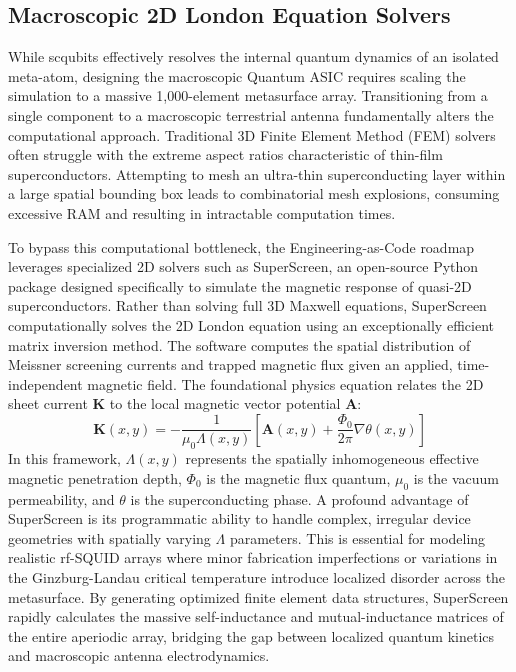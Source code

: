 \documentclass[11pt,a4paper]{article}
\begin{document}
\subsection{Macroscopic 2D London Equation Solvers}

While scqubits effectively resolves the internal quantum dynamics of an isolated meta-atom, designing the macroscopic Quantum ASIC requires scaling the simulation to a massive 1,000-element metasurface array.\cite{ref6} Transitioning from a single component to a macroscopic terrestrial antenna fundamentally alters the computational approach.\cite{ref6} Traditional 3D Finite Element Method (FEM) solvers often struggle with the extreme aspect ratios characteristic of thin-film superconductors.\cite{ref6} Attempting to mesh an ultra-thin superconducting layer within a large spatial bounding box leads to combinatorial mesh explosions, consuming excessive RAM and resulting in intractable computation times.\cite{ref6}

To bypass this computational bottleneck, the Engineering-as-Code roadmap leverages specialized 2D solvers such as SuperScreen, an open-source Python package designed specifically to simulate the magnetic response of quasi-2D superconductors.\cite{ref6} Rather than solving full 3D Maxwell equations, SuperScreen computationally solves the 2D London equation using an exceptionally efficient matrix inversion method.\cite{ref6} The software computes the spatial distribution of Meissner screening currents and trapped magnetic flux given an applied, time-independent magnetic field.\cite{ref6} The foundational physics equation relates the 2D sheet current $\mathbf{K}$ to the local magnetic vector potential $\mathbf{A}$:
\begin{equation}
\mathbf{K}(x,y) = -\frac{1}{\mu_0 \Lambda(x,y)} \left[ \mathbf{A}(x,y) + \frac{\Phi_0}{2\pi} \nabla\theta(x,y) \right]
\end{equation}
In this framework, $\Lambda(x,y)$ represents the spatially inhomogeneous effective magnetic penetration depth, $\Phi_0$ is the magnetic flux quantum, $\mu_0$ is the vacuum permeability, and $\theta$ is the superconducting phase.\cite{ref6} A profound advantage of SuperScreen is its programmatic ability to handle complex, irregular device geometries with spatially varying $\Lambda$ parameters.\cite{ref6} This is essential for modeling realistic rf-SQUID arrays where minor fabrication imperfections or variations in the Ginzburg-Landau critical temperature introduce localized disorder across the metasurface.\cite{ref6} By generating optimized finite element data structures, SuperScreen rapidly calculates the massive self-inductance and mutual-inductance matrices of the entire aperiodic array, bridging the gap between localized quantum kinetics and macroscopic antenna electrodynamics.\cite{ref6}
\end{document}
